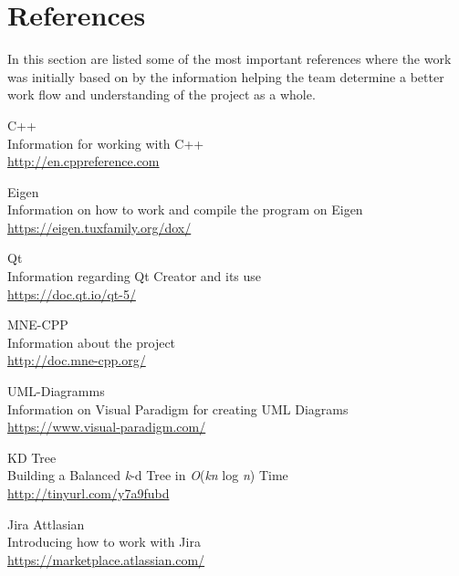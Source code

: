 \section{References}

In this section are listed some of the most important references where the work was initially based on by the information helping the team determine a better work flow and understanding of the project as a whole. 

\begin{aims}
	\item [C++] 
	~\\
		Information for working with C++\\
		\url{http://en.cppreference.com}
	\item [Eigen]
	~\\ 
	Information on how to work and compile the program on Eigen
\\		\url{https://eigen.tuxfamily.org/dox/}
	\item [Qt] 
	~\\
	Information regarding Qt Creator and its use\\
		\url{https://doc.qt.io/qt-5/}
	\item [MNE-CPP]
	~\\
	Information about the project\\
		\url{http://doc.mne-cpp.org/}
	\item [UML-Diagramms]
	~\\
	Information on Visual Paradigm for creating UML Diagrams\\
		\url{https://www.visual-paradigm.com/}
	\item[KD Tree]
	~\\
	Building a Balanced \textit{k}-d Tree in \textit{O}(\textit{kn} log \textit{n}) Time\\
	\url{http://tinyurl.com/y7a9fubd}
	\item [Jira Attlasian]
	~\\
	Introducing how to work with Jira\\
	\url{https://marketplace.atlassian.com/}
	

	
\end{aims}